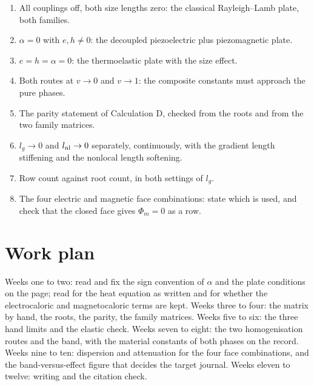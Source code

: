 \documentclass[11pt]{article}
\begin{document}
\begin{enumerate}
\item All couplings off, both size lengths zero: the classical Rayleigh--Lamb plate, both families.
\item $\alpha=0$ with $e,h\ne0$: the decoupled piezoelectric plus piezomagnetic plate.
\item $e=h=\alpha=0$: the thermoelastic plate with the size effect.
\item Both routes at $v\to0$ and $v\to1$: the composite constants must approach the pure phases.
\item The parity statement of Calculation D, checked from the roots and from the two family matrices.
\item $l_g\to0$ and $l_{\rm nl}\to0$ separately, continuously, with the gradient length stiffening and the
nonlocal length softening.
\item Row count against root count, in both settings of $l_g$.
\item The four electric and magnetic face combinations: state which is used, and check that the closed face
gives $\Phi_m=0$ as a row.
\end{enumerate}

\section{Work plan}\label{sec:plan}

Weeks one to two: read \cite{Chen2007} and fix the sign convention of $\alpha$ and the plate conditions on
the page; read \cite{Matlam2026} for the heat equation as written and for whether the electrocaloric and
magnetocaloric terms are kept. Weeks three to four: the matrix by hand, the roots, the parity, the family
matrices. Weeks five to six: the three hand limits and the elastic check. Weeks seven to eight: the two
homogenisation routes and the band, with the material constants of both phases on the record. Weeks nine to
ten: dispersion and attenuation for the four face combinations, and the band-versus-effect figure that
decides the target journal. Weeks eleven to twelve: writing and the citation check.



\end{document}
